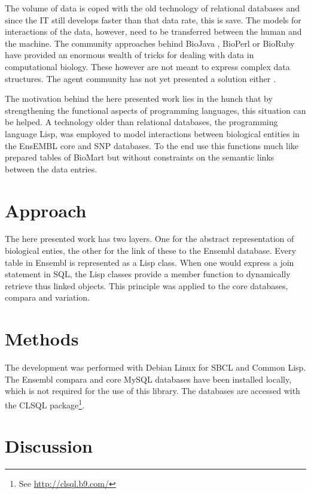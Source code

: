 \documentclass{bioinfo}
\begin{document}
The volume of data is coped with the old technology of relational
databases and since the IT still develops faster than that data rate, this
is save. The models for interactions of the data, however, need to be
transferred between the human and the machine. The community approaches
behind BioJava \citep{biojava}, BioPerl \citep{bioperl:2002} or BioRuby
\citep{bioruby} have provided an enormous wealth of
tricks for dealing with data in computational biology. These however are not
meant to express complex data structures. The agent community has not yet
presented a solution either \citep{agents:2007}.

The motivation behind the here presented work lies in the hunch that
by strengthening the functional aspects of programming languages, this
situation can be helped.  A technology older than relational databases,
the programming language Lisp, was employed to model interactions
between biological entities in the EnsEMBL \citep{BiAnCaChClCoCoCuCuCuDoDuFeFlGrHaHeHoHu06}
core and SNP databases. To
the end use this functions much like prepared tables of BioMart but
without constraints on the semantic links between the data entries.

\section{Approach}

The here presented work has two layers. One for the abstract representation of biological enties,
the other for the link of these to the Ensembl database. Every table
in Ensembl is represented as a Lisp class. When one would express a
join statement in SQL, the Lisp classes provide a member function to
dynamically retrieve thus linked objects. This principle was applied to
the core databases, compara and variation.


\section{Methods}
\begin{methods}
The development was performed with Debian Linux for SBCL and Common Lisp. The Ensembl
compara and core MySQL databases have been installed locally, which is not required
for the use of this library. The databases are accessed with the CLSQL
package\footnote{See \href{http://clsql.b9.com/}{http://clsql.b9.com/}}.
\end{methods}

\section{Discussion}
\end{document}
